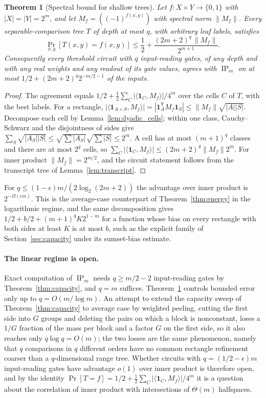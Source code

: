 \documentclass[11pt]{article}
\newtheorem{theorem}{Theorem}[section]
\theoremstyle{definition}
\newcommand{\bits}{\{0,1\}}
\newcommand{\ip}{\operatorname{IP}}
\begin{document}
\begin{theorem}[Spectral bound for shallow trees]\label{thm:spectral_avg}
Let \(f:X\times Y\to\bits\) with \(|X|=|Y|=2^m\), and let \(M_f=((-1)^{f(x,y)})\) with spectral norm \(\|M_f\|\). Every separable-comparison tree \(T\) of depth at most \(q\), with arbitrary leaf labels, satisfies
\[
 \Pr_{x,y}[T(x,y)=f(x,y)]\le\frac12+\frac{(2m+2)^q\,\|M_f\|}{2^{m+1}}.
\]
Consequently every threshold circuit with \(q\) input-reading gates, of any depth and with any real weights and any readout of its gate values, agrees with \(\ip_m\) on at most \(1/2+(2m+2)^q2^{-m/2-1}\) of the inputs.
\end{theorem}
\begin{proof}
The agreement equals \(1/2+\frac12\sum_C|\langle\mathbf 1_C,M_f\rangle|/4^m\) over the cells \(C\) of \(T\), with the best labels. For a rectangle, \(|\langle\mathbf1_{A\times S},M_f\rangle|=|\mathbf1_A^{\mathsf T}M_f\mathbf1_S|\le\|M_f\|\sqrt{|A||S|}\). Decompose each cell by Lemma~\ref{lem:dyadic_cells}; within one class, Cauchy--Schwarz and the disjointness of sides give \(\sum_S\sqrt{|A_S||S|}\le\sqrt{\sum|A_S|}\sqrt{\sum|S|}\le2^m\). A cell has at most \((m+1)^q\) classes and there are at most \(2^q\) cells, so \(\sum_C|\langle\mathbf1_C,M_f\rangle|\le(2m+2)^q\|M_f\|2^m\). For inner product \(\|M_f\|=2^{m/2}\), and the circuit statement follows from the transcript tree of Lemma~\ref{lem:transcript}.
\end{proof}

For \(q\le(1-\epsilon)m/(2\log_2(2m+2))\) the advantage over inner product is \(2^{-\Omega(\epsilon m)}\). This is the average-case counterpart of Theorem~\ref{thm:energy} in the logarithmic regime, and the same decomposition gives \(1/2+b/2+(m+1)^qK2^{1-m}\) for a function whose bias on every rectangle with both sides at least \(K\) is at most \(b\), such as the explicit family of Section~\ref{sec:capacity} under its sumset-bias estimate.

\paragraph{The linear regime is open.}
Exact computation of \(\ip_m\) needs \(q\ge m/2-2\) input-reading gates by Theorem~\ref{thm:capacity}, and \(q=m\) suffices. Theorem~\ref{thm:spectral_avg} controls bounded error only up to \(q=O(m/\log m)\). An attempt to extend the capacity sweep of Theorem~\ref{thm:capacity} to average case by weighted peeling, cutting the first side into \(G\) groups and deleting the pairs on which a block is nonconstant, loses a \(1/G\) fraction of the mass per block and a factor \(G\) on the first side, so it also reaches only \(q\log q=O(m)\); the two losses are the same phenomenon, namely that \(q\) comparisons in \(q\) different orders have no common rectangle refinement coarser than a \(q\)-dimensional range tree. Whether circuits with \(q=(1/2-\epsilon)m\) input-reading gates have advantage \(o(1)\) over inner product is therefore open, and by the identity \(\Pr[T=f]=1/2+\frac12\sum_C|\langle\mathbf1_C,M_f\rangle|/4^m\) it is a question about the correlation of inner product with intersections of \(\Theta(m)\) halfspaces.
\end{document}
